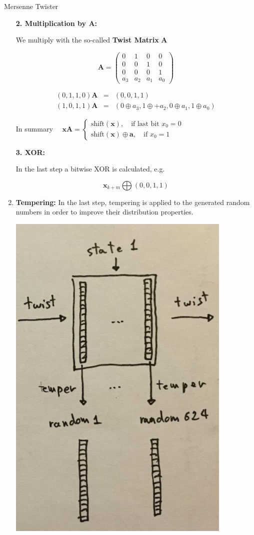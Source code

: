 \begin{vbframe}{Mersenne Twister}
\begin{enumerate}
\framebreak
\begin{footnotesize}
\textbf{2. Multiplication by $\mathbf{A}$: }


We multiply with the so-called \textbf{Twist Matrix} $\mathbf{A}$

$$
\mathbf{A} = \begin{pmatrix}
0 & 1 & 0 & 0  \\
0 & 0 & 1 & 0 \\
 0 & 0 & 0 & 1 \\
a_{3} & a_{2} & a_{1} & a_0
\end{pmatrix}
$$

\begin{eqnarray*}
(0, 1, 1, 0)  \mathbf{A} &=& (0, 0, 1, 1)\\
(1, 0, 1, 1) \mathbf{A} &=& (0 \oplus a_3, 1 \oplus + a_2, 0 \oplus a_1, 1 \oplus a_0)
\end{eqnarray*}

In summary $\quad
\mathbf{x}\mathbf{A} = \begin{cases}
\text{shift}(\mathbf{x}), \quad \text{if last bit } x_0 = 0 \\
\text{shift}(\mathbf{x}) \oplus \mathbf{a} , \quad \text{if } x_0 = 1
\end{cases}
$

\lz

\textbf{3. XOR: }


In the last step a bitwise XOR is calculated, e.g.

$$
\mathbf{x}_{k + m} \bigoplus (0, 0, 1, 1)
$$
\end{footnotesize}

\framebreak

\item \textbf{Tempering:}  In the last step, tempering is applied to the generated random numbers in order to improve their distribution properties.

\vspace*{0.2cm}

\begin{center}
	\includegraphics[width = 0.3 \textwidth]{figure_man/temper.png}
\end{center}
\end{enumerate}


\end{vbframe}
